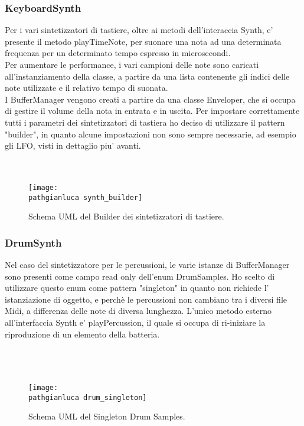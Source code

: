 \documentclass[a4paper,12pt]{report}
\newcommand\pathgianluca{img/gianluca/}
\begin{document}
\subsubsection{KeyboardSynth}
Per i vari sintetizzatori di tastiere, oltre ai metodi dell'interaccia Synth, e' presente il metodo playTimeNote, per suonare una nota ad una determinata frequenza per un determinato tempo espresso in microsecondi. \\
Per aumentare le performance, i vari campioni delle note sono caricati all'instanziamento della classe, a partire da una lista contenente gli indici delle note utilizzate e il relativo tempo di suonata. \\
I BufferManager vengono creati a partire da una classe Enveloper, che si occupa di gestire il volume della nota in entrata e in uscita.
Per impostare correttamente tutti i parametri dei sintetizzatori di tastiera ho deciso di utilizzare il pattern "builder", in quanto alcune impostazioni non sono sempre necessarie, ad esempio gli LFO, visti in dettaglio piu' avanti. \\ \\ \\
\begin{figure}[!htb]
	\centerline{\texttt{[image: \\pathgianluca synth\_builder]}}
	\caption{Schema UML del Builder dei sintetizzatori di tastiere.}
	\label{img:SynthBuilder}
\end{figure}
\clearpage
\subsubsection{DrumSynth}
Nel caso del sintetizzatore per le percussioni, le varie istanze di BufferManager sono presenti come campo read only dell'enum DrumSamples. Ho scelto di utilizzare questo enum come pattern "singleton" in quanto non richiede l' istanziazione di oggetto, e perchè le percussioni non cambiano tra i diversi file Midi, a differenza delle note di diversa lunghezza.
L'unico metodo esterno all'interfaccia Synth e' playPercussion, il quale si occupa di ri-iniziare la riproduzione di un elemento della batteria. \\
\\ \\ \\
\begin{figure}[!htb]
	\centerline{\texttt{[image: \\pathgianluca drum\_singleton]}}
	\caption{Schema UML del Singleton Drum Samples.}
	\label{img:drumSingleton}
\end{figure}
\clearpage
\end{document}
